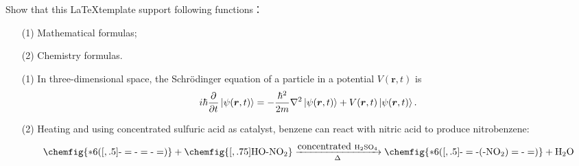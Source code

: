 \documentclass[en]{assignment}
\begin{document}
    \begin{prob}
        Show that this \LaTeX template support following functions：
        \begin{itemize}
            \item[(1)] Mathematical formulas;
            \item[(2)] Chemistry formulas.
        \end{itemize}
    \end{prob}
    \begin{sol}
        \begin{itemize}
            \item[(1)] In three-dimensional space, the Schrödinger equation of a particle in a potential $V(\bm{r},t)$ is
            \begin{equation}
                i\hbar\frac{\partial}{\partial t}\left\lvert\psi(\bm{r},t)\right\rangle=-\frac{\hbar^2}{2m}\nabla^2\left\lvert\psi(\bm{r},t)\right\rangle+V(\bm{r},t)\left\lvert\psi(\bm{r},t)\right\rangle.
            \end{equation}
            \item[(2)] Heating and using concentrated sulfuric acid as catalyst, benzene can react with nitric acid to produce nitrobenzene:
            \begin{equation}
                \ce{\chemfig{*6([,.5]-=-=-=)} + \chemfig{[,.75]HO-NO_2} ->[\mbox{concentrated }H2SO4][$\Delta$] \chemfig{*6([,.5]-=-(-NO_2)=-=)} + H2O}
            \end{equation}
        \end{itemize}
    \end{sol}

    \clearpage
\end{document}
